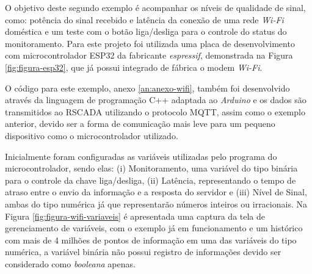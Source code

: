 O objetivo deste segundo exemplo é acompanhar os níveis de qualidade de sinal, como: potência do sinal recebido e latência da conexão de uma rede  \textit{Wi-Fi} doméstica e um teste com o botão liga/desliga para o controle do status do monitoramento. Para este projeto foi utilizada uma placa de desenvolvimento com microcontrolador ESP32 da fabricante \textit{espressif}, demonstrada na Figura \ref{fig:figura-esp32}, que já possui integrado de fábrica o modem \textit{Wi-Fi}.

O código para este exemplo, anexo \ref{an:anexo-wifi}, também foi desenvolvido através da linguagem de programação C++ adaptada ao \textit{Arduino} e os dados são transmitidos ao RSCADA utilizando o protocolo \gls{MQTT}, assim como o exemplo anterior, devido ser a forma de comunicação mais leve para um pequeno dispositivo como o microcontrolador utilizado.

        \begin{figure}[!h]
    	\end{figure}
    	
Inicialmente foram configuradas as variáveis utilizadas pelo programa do microcontrolador, sendo elas: (i) Monitoramento, uma variável do tipo binária para o controle da chave liga/desliga, (ii)  Latência, representando o tempo de atraso entre o envio da informação e a resposta do servidor e (iii) Nível de Sinal, ambas do tipo numérica já que representarão números inteiros ou irracionais. Na Figura \ref{fig:figura-wifi-variaveis} é apresentada uma captura da tela de gerenciamento de variáveis, com o exemplo já em funcionamento e um histórico com mais de 4 milhões de pontos de informação em uma das variáveis do tipo numérica, a variável binária não possui registro de informações devido ser considerado como  \textit{booleana} apenas.

